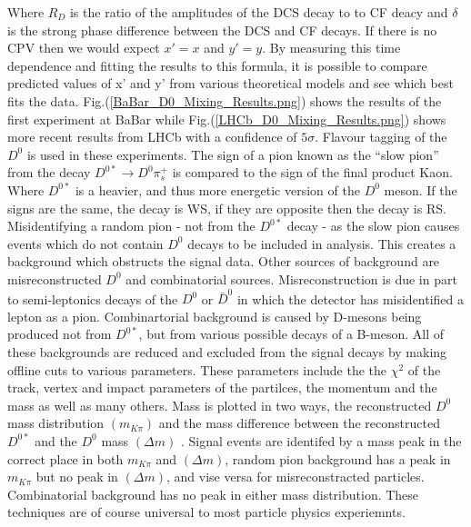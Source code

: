 \noindent Where $R_{D}$ is the ratio of the amplitudes of the DCS decay to to CF deacy and $\delta$ is the strong phase difference between the DCS and CF decays. If there is no CPV then we would expect $x' = x$ and $y' = y$. By measuring this time dependence and fitting the results to this formula, it is possible to compare predicted values of x' and y' from various theoretical models and see which best fits the data. Fig.(\ref{BaBar_D0_Mixing_Results.png}) shows the results of the first experiment at BaBar while Fig.(\ref{LHCb_D0_Mixing_Results.png}) shows more recent results from LHCb with a confidence of $5 \sigma$. Flavour tagging of the $D^{0}$ is used in these experiments. The sign of a pion known as the ``slow pion'' from the decay $D^{0*} \rightarrow D^{0} \pi^{+}_{s}$ is compared to the sign of the final product Kaon. Where $D^{0*}$ is a heavier, and thus more energetic version of the $D^{0}$ meson. If the signs are the same, the decay is WS, if they are opposite then the decay is RS. Misidentifying a random pion - not from the $D^{0*}$ decay - as the slow pion causes events which do not contain $D^{0}$ decays to be included in analysis. This creates a background which obstructs the signal data. Other sources of background are misreconstructed $D^{0}$ and combinatorial sources. Misreconstruction is due in part to semi-leptonics decays of the $D^{0}$ or $\bar{D}^{0}$ in which the detector has misidentified a lepton as a pion. Combinartorial background is caused by D-mesons being produced not from $D^{0*}$, but from various possible decays of a B-meson. All of these backgrounds are reduced and excluded from the signal decays by making offline cuts to various parameters. These parameters include the the $\chi^{2}$ of the track, vertex and impact parameters of the partilces, the momentum and the mass as well as many others. Mass is plotted in two ways, the reconstructed $D^{0}$ mass distribution $(m_{K \pi})$ and the mass difference between the reconstructed $D^{0*}$ and the $D^{0}$ mass $(\Delta m)$ \cite{Kevin}. Signal events are identifed by a mass peak in the correct place in both $m_{K \pi}$ and $(\Delta m)$, random pion background has a peak in $m_{K \pi}$ but no peak in $(\Delta m)$, and vise versa for misreconstracted particles. Combinatorial background has no peak in either mass distribution. These techniques are of course universal to most particle physics experiemnts. 

